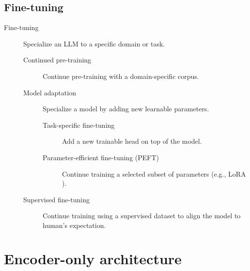 \subsection{Fine-tuning}

\begin{description}
    \item[Fine-tuning] 
        Specialize an LLM to a specific domain or task.

        \begin{description}
            \item[Continued pre-training] 
                Continue pre-training with a domain-specific corpus.

            \item[Model adaptation]
                Specialize a model by adding new learnable parameters.

                \begin{description}
                    \item[Task-specific fine-tuning] 
                        Add a new trainable head on top of the model.

                    \item[Parameter-efficient fine-tuning (PEFT)] 
                        Continue training a selected subset of parameters (e.g., LoRA ).
                \end{description}

            \item[Supervised fine-tuning] 
                Continue training using a supervised dataset to align the model to human's expectation.
        \end{description}
\end{description}



\section{Encoder-only architecture} \label{sec:mlm}

